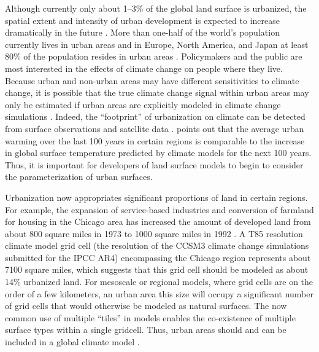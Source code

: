 \documentclass[12pt,authoryear]{elsarticle}
\numberwithin{equation}{section} %
\begin{document}
Although currently only about 1--3\% of the global land surface is urbanized, the spatial extent and intensity of urban development is expected to increase dramatically in
the future \citep{shepherdReviewCurrentInvestigations2005}. More than one-half of the world’s population currently lives in urban areas and in Europe, North America, and Japan at
least 80\% of the population resides in urban areas \citep{gutmanLandChangeScience2004}. Policymakers and the public are most interested in the effects of climate change on people where they live. Because urban and non-urban areas may have different sensitivities to climate change, it is possible that the true climate change signal within urban areas may only be estimated if urban areas are explicitly modeled in climate change simulations \citep{bestProgressBetterWeather2006}. Indeed, the ``footprint'' of urbanization on climate can be detected from surface observations and satellite data \citep{changnonInadvertentWeatherModification1992,kalnayImpactUrbanizationLanduse2003,zhouEvidenceSignificantUrbanization2004,jinFootprintUrbanAreas2005}. \citet{changnonInadvertentWeatherModification1992} points out that the average urban warming over the last 100 years in certain regions is comparable to the increase in global surface temperature predicted by climate models for the next 100 years. Thus, it is important for developers of land surface models to begin to consider the parameterization of urban surfaces.

Urbanization now appropriates significant proportions of land in certain regions. For example, the expansion of service-based industries and conversion of farmland for
housing in the Chicago area has increased the amount of developed land from about 800 square miles in 1973 to 1000 square miles in 1992 \citep{auchUrbanGrowthAmerican2004}. A T85 resolution climate model grid cell (the resolution of the CCSM3 climate change simulations submitted for the IPCC AR4) encompassing the Chicago region represents about 7100 square miles, which suggests that this grid cell should be modeled as about 14\% urbanized land. For mesoscale or regional models, where grid cells are on the order of a few kilometers, an urban area this size will occupy a significant number of grid cells that would otherwise be modeled as natural surfaces. The now common use of multiple ``tiles'' in models enables the co-existence of multiple surface types within a single gridcell. Thus, urban areas should and can be included in a global climate model \citep{bestProgressBetterWeather2006}.
\end{document}
